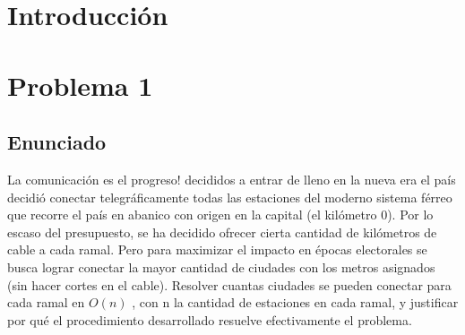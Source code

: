 \documentclass{article}
\theoremstyle{definition}
\theoremstyle{remark}
\begin{document}
{} %

\grupo{}

 
\maketitle

\pagebreak

\tableofcontents

\pagebreak

\section{Introducción}

\section{Problema 1}

\subsection{Enunciado}
La comunicación es el progreso! decididos a entrar de lleno en la nueva era el país decidió conectar telegráficamente todas las estaciones del moderno sistema férreo que recorre el país en abanico con origen en la capital (el kilómetro 0). Por lo escaso del presupuesto, se ha decidido ofrecer cierta cantidad de kilómetros de cable a cada ramal. Pero para maximizar el impacto en épocas electorales se busca lograr conectar la mayor cantidad de ciudades con los metros asignados (sin hacer cortes en el cable).
Resolver cuantas ciudades se pueden conectar para cada ramal en $O(n)$ , con n la cantidad de estaciones en cada ramal, y justificar por qué el procedimiento desarrollado resuelve efectivamente el problema.
\end{document}
